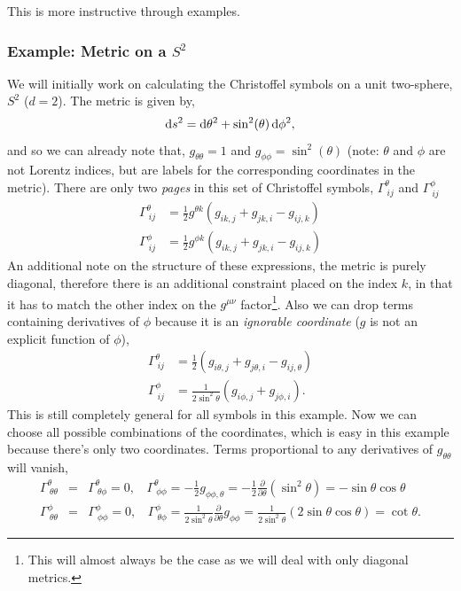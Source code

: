This is more instructive through examples. 
\subsubsection{Example: Metric on a $S^2$}
We will initially work on calculating the Christoffel symbols on a unit two-sphere, $S^2$ ($d=2$). The metric is given by, 
\begin{equation}\label{two-sphere-metric}
    \operatorname{d}\!{s}^2 = \operatorname{d}\!{\theta}^2 + \sin^2(\theta)\operatorname{d}\!{\phi}^2,
\end{equation}
and so we can already note that, $g_{\theta\theta} = 1$ and $g_{\phi\phi}=\sin^2(\theta)$ (note: $\theta$ and $\phi$ are not Lorentz indices, but are labels for the corresponding coordinates in the metric). There are only two \textit{pages} in this set of Christoffel symbols, $\Gamma^{\theta}_{\ ij}$ and $\Gamma^{\phi}_{\ ij}$ 
\begin{equation}
\begin{split}
\Gamma^{\theta}_{\ ij} &= \frac{1}{2}g^{\theta k}\left(g_{ik,j} + g_{jk,i} - g_{ij,k}\right)\\
\Gamma^{\phi}_{\ ij} &= \frac{1}{2}g^{\phi k}\left(g_{ik,j} + g_{jk,i} - g_{ij,k}\right)
\end{split}
\end{equation}
An additional note on the structure of these expressions, the metric is purely diagonal, therefore there is an additional constraint placed on the index $k$, in that it has to match the other index on the $g^{\mu\nu}$ factor\footnote{This will almost always be the case as we will deal with only diagonal metrics.}. Also we can drop terms containing derivatives of $\phi$ because it is an \textit{ignorable coordinate} ($g$ is not an explicit function of $\phi$), 
\begin{equation}
    \begin{split}
        \Gamma^{\theta}_{\ ij} &= \frac{1}{2}\left(g_{i\theta,j} + g_{j\theta,i} - g_{ij,\theta}\right)\\
\Gamma^{\phi}_{\ ij} &= \frac{1}{2\sin^2\theta}\left(g_{i\phi,j} + g_{j\phi,i}\right).
    \end{split}
\end{equation}
This is still completely general for all symbols in this example. Now we can choose all possible combinations of the coordinates, which is easy in this example because there's only two coordinates. Terms proportional to any derivatives of $g_{\theta\theta}$ will vanish, 
\begin{eqnarray*}
    \Gamma^{\theta}_{\ \theta\theta} &=& \Gamma^{\theta}_{\ \theta\phi}=0, \ \ \ \ \Gamma^{\theta}_{\ \phi\phi} = -\frac{1}{2}g_{\phi\phi,\theta} = -\frac{1}{2}\frac{\partial}{\partial\theta}(\sin^2\theta) = -\sin\theta\cos\theta\\
    \Gamma^{\phi}_{\ \theta\theta} &=& \Gamma^{\phi}_{\ \phi\phi} = 0,\ \ \ \ \Gamma^{\phi}_{\ \theta\phi} = \frac{1}{2\sin^2\theta}\frac{\partial}{\partial\theta}g_{\phi\phi} = \frac{1}{2\sin^2\theta}(2\sin\theta\cos\theta) = \cot\theta.
\end{eqnarray*}
